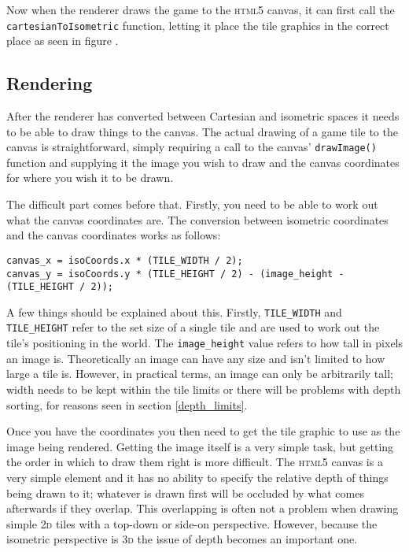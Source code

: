 Now when the renderer draws the game to the \textsc{html5} canvas, it can first call the \texttt{cartesianToIsometric} function, letting it place the tile graphics in the correct place as seen in figure .

\subsection{Rendering}
After the renderer has converted between Cartesian and isometric spaces it needs to be able to draw things to the canvas. The actual drawing of a game tile to the canvas is straightforward, simply requiring a call to the canvas' \texttt{drawImage()} function and supplying it the image you wish to draw and the canvas coordinates for where you wish it to be drawn.

The difficult part comes before that. Firstly, you need to be able to work out what the canvas coordinates are. The conversion between isometric coordinates and the canvas coordinates works as follows:

\noindent
\begin{minipage}{\linewidth}
\begin{lstlisting}[style=js, caption={Conversion between isometric coordinates and canvas coordinates.}, label=isometric_to_canvas]
canvas_x = isoCoords.x * (TILE_WIDTH / 2);
canvas_y = isoCoords.y * (TILE_HEIGHT / 2) - (image_height - (TILE_HEIGHT / 2));
\end{lstlisting}
\end{minipage}

A few things should be explained about this. Firstly, \texttt{TILE\_WIDTH} and \texttt{TILE\_HEIGHT} refer to the set size of a single tile and are used to work out the tile's positioning in the world. The \texttt{image\_height} value refers to how tall in pixels an image is. Theoretically an image can have any size and isn't limited to how large a tile is. However, in practical terms, an image can only be arbitrarily tall; width needs to be kept within the tile limits or there will be problems with depth sorting, for reasons seen in section \ref{depth_limits}.


Once you have the coordinates you then need to get the tile graphic to use as the image being rendered. Getting the image itself is a very simple task, but getting the order in which to draw them right is more difficult. The \textsc{html5} canvas is a very simple element and it has no ability to specify the relative depth of things being drawn to it; whatever is drawn first will be occluded by what comes afterwards if they overlap. This overlapping is often not a problem when drawing simple \textsc{2d} tiles with a top-down or side-on perspective. However, because the isometric perspective is \textsc{3d} the issue of depth becomes an important one.

